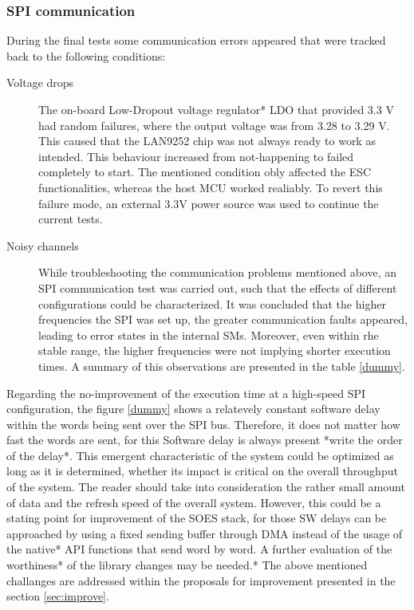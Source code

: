 \subsubsection{SPI communication}
During the final tests some communication errors appeared that were tracked back to the following conditions: %
\begin{description}
    \item[Voltage drops] The on-board Low-Dropout voltage regulator* LDO that provided 3.3 V had random failures, where 
    the output voltage was from 3.28 to 3.29 V. This caused that the LAN9252 chip was not always ready to work as intended. 
    This behaviour increased from not-happening to failed completely to start. The mentioned condition obly affected the ESC functionalities,
    whereas the host MCU worked realiably. To revert this failure mode, an external 3.3V power source was used to continue
    the current tests. 
    \item[Noisy channels] While troubleshooting the communication problems mentioned above, an SPI communication
    test was carried out, such that the effects of different configurations could be characterized. It was concluded that
    the higher frequencies the SPI was set up, the greater communication faults appeared, leading to error states in the 
    internal SMs. Moreover, even within rhe stable range, the higher frequencies were not implying shorter execution times.
    A summary of this observations are presented in the table \ref{dummy}.  
\end{description}
Regarding the no-improvement of the execution time at a high-speed SPI configuration, the figure \ref{dummy} shows 
a relatevely constant software delay within the words being sent over the SPI bus. Therefore, it does not matter how fast the
words are sent, for this Software delay is always present *write the order of the delay*. This emergent characteristic of
the system could be optimized as long as it is determined, whether its impact is critical on the overall throughput of the system.
The reader should take into consideration the rather small amount of data and the refresh speed of the overall system. However, this
could be a stating point for improvement of the SOES stack, for those SW delays can be approached by using a fixed sending buffer
through DMA instead of the usage of the native* API functions that send word by word. A further evaluation of the worthiness*
of the library changes may be needed.*
The above mentioned challanges are addressed within the proposals for improvement presented in the section \ref{sec:improve}.
